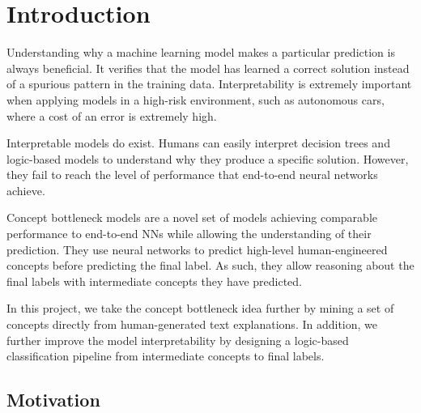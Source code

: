





\chapter{Introduction}


Understanding why a machine learning model makes a particular prediction is always beneficial. 
It verifies that the model has learned a correct solution instead of a spurious pattern in the training data.
Interpretability is extremely important when applying models in a high-risk environment, such as autonomous cars, where a cost of an error is extremely high.

Interpretable models do exist.
Humans can easily interpret decision trees and logic-based models to understand why they produce a specific solution.
However, they fail to reach the level of performance that end-to-end neural networks achieve.

Concept bottleneck models \cite{RefWorks:RefID:35-koh2020concept} are a novel set of models achieving comparable performance to end-to-end NNs while allowing the understanding of their prediction.
They use neural networks to predict high-level human-engineered concepts before predicting the final label.
As such, they allow reasoning about the final labels with intermediate concepts they have predicted.

In this project, we take the concept bottleneck idea further by mining a set of concepts directly from human-generated text explanations.
In addition, we further improve the model interpretability by designing a logic-based classification pipeline from intermediate concepts to final labels.




\section{Motivation}

